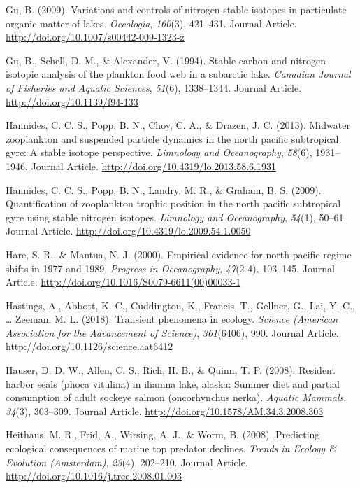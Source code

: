 \documentclass [11pt, proquest] {uwthesis}[2015/03/03]
\begin{document}
\hypertarget{ref-Gu2009}{}
Gu, B. (2009). Variations and controls of nitrogen stable isotopes in
particulate organic matter of lakes. \emph{Oecologia}, \emph{160}(3),
421--431. Journal Article.
\url{http://doi.org/10.1007/s00442-009-1323-z}

\hypertarget{ref-Gu1994}{}
Gu, B., Schell, D. M., \& Alexander, V. (1994). Stable carbon and
nitrogen isotopic analysis of the plankton food web in a subarctic lake.
\emph{Canadian Journal of Fisheries and Aquatic Sciences}, \emph{51}(6),
1338--1344. Journal Article. \url{http://doi.org/10.1139/f94-133}

\hypertarget{ref-Hannides2013}{}
Hannides, C. C. S., Popp, B. N., Choy, C. A., \& Drazen, J. C. (2013).
Midwater zooplankton and suspended particle dynamics in the north
pacific subtropical gyre: A stable isotope perspective. \emph{Limnology
and Oceanography}, \emph{58}(6), 1931--1946. Journal Article.
\url{http://doi.org/10.4319/lo.2013.58.6.1931}

\hypertarget{ref-Hannides2009}{}
Hannides, C. C. S., Popp, B. N., Landry, M. R., \& Graham, B. S. (2009).
Quantification of zooplankton trophic position in the north pacific
subtropical gyre using stable nitrogen isotopes. \emph{Limnology and
Oceanography}, \emph{54}(1), 50--61. Journal Article.
\url{http://doi.org/10.4319/lo.2009.54.1.0050}

\hypertarget{ref-Hare2000}{}
Hare, S. R., \& Mantua, N. J. (2000). Empirical evidence for north
pacific regime shifts in 1977 and 1989. \emph{Progress in Oceanography},
\emph{47}(2-4), 103--145. Journal Article.
\url{http://doi.org/10.1016/S0079-6611(00)00033-1}

\hypertarget{ref-Hastings2018}{}
Hastings, A., Abbott, K. C., Cuddington, K., Francis, T., Gellner, G.,
Lai, Y.-C., \ldots{} Zeeman, M. L. (2018). Transient phenomena in
ecology. \emph{Science (American Association for the Advancement of
Science)}, \emph{361}(6406), 990. Journal Article.
\url{http://doi.org/10.1126/science.aat6412}

\hypertarget{ref-Hauser2008}{}
Hauser, D. D. W., Allen, C. S., Rich, H. B., \& Quinn, T. P. (2008).
Resident harbor seals (phoca vitulina) in iliamna lake, alaska: Summer
diet and partial consumption of adult sockeye salmon (oncorhynchus
nerka). \emph{Aquatic Mammals}, \emph{34}(3), 303--309. Journal Article.
\url{http://doi.org/10.1578/AM.34.3.2008.303}

\hypertarget{ref-Heithaus2008}{}
Heithaus, M. R., Frid, A., Wirsing, A. J., \& Worm, B. (2008).
Predicting ecological consequences of marine top predator declines.
\emph{Trends in Ecology \& Evolution (Amsterdam)}, \emph{23}(4),
202--210. Journal Article.
\url{http://doi.org/10.1016/j.tree.2008.01.003}
\end{document}
